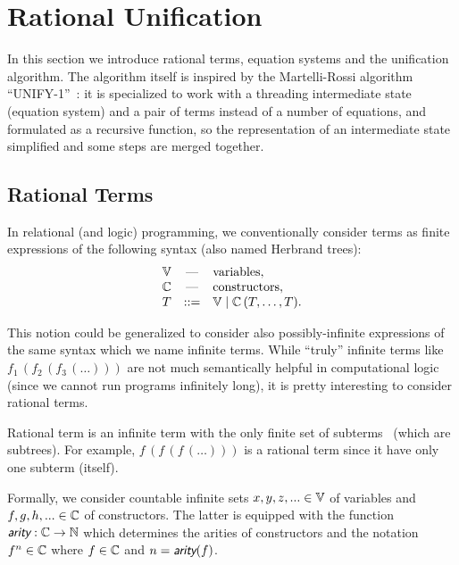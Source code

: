\section{Rational Unification}

In this section we introduce rational terms, equation systems and the unification algorithm. The algorithm itself is inspired by the Martelli-Rossi algorithm ``UNIFY-1''~\cite{martelli1984efficient}: it is specialized to work with a threading intermediate state (equation system) and a pair of terms instead of a number of equations, and formulated as a recursive function, so the representation of an intermediate state simplified and some steps are merged together.

\subsection{Rational Terms}

In relational (and logic) programming, we conventionally consider terms as finite expressions of the following syntax (also named Herbrand trees):
\begin{equation*}
    \begin{array}{ccl}
        \mathbb{V} & \text{---} & \text{variables}, \\
        \mathbb{C} & \text{---} & \text{constructors}, \\
        T & ::= & \mathbb{V} \mid \mathbb{C}\,(T, \dots, T). \\
    \end{array}
\end{equation*}

This notion could be generalized to consider also possibly-infinite expressions of the same syntax which we name infinite terms. While ``truly'' infinite terms like $f_1\,(f_2\,(f_3\,(\dots)))$ are not much semantically helpful in computational logic (since we cannot run programs infinitely long), it is pretty interesting to consider rational terms.

Rational term is an infinite term with the only finite set of subterms~\cite{colmerauer1982prolog} (which are subtrees). For example, $f\,(f\,(f\,(\dots)))$ is a rational term since it have only one subterm (itself).

Formally, we consider countable infinite sets $x, y, z, ... \in \mathbb{V}$ of variables and $f, g, h, ... \in \mathbb{C}$ of constructors. The latter is equipped with the function $\arity : \C \rightarrow \N$ which determines the arities of constructors and the notation $f^n \in \mathbb{C}$ where $f \in \mathbb{C}$ and $n = \arity(f)$.

